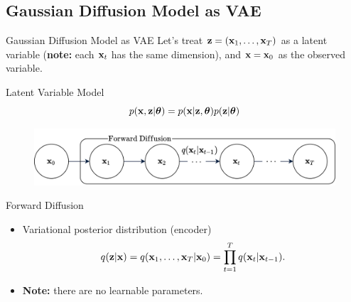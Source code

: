 \documentclass{beamer}
\begin{document}
\subsection{Gaussian Diffusion Model as VAE}
\begin{frame}{Gaussian Diffusion Model as VAE}
    Let's treat $\mathbf{z} = (\mathbf{x}_1, \dots, \mathbf{x}_T)$ as a latent variable (\textbf{note:} each $\mathbf{x}_t$ has the same dimension), and $\mathbf{x} = \mathbf{x}_0$ as the observed variable.
    \begin{block}{Latent Variable Model}
        \vspace{-0.3cm}
        \[
            p(\mathbf{x}, \mathbf{z} | \boldsymbol{\theta}) = p(\mathbf{x} | \mathbf{z}, \boldsymbol{\theta}) p(\mathbf{z} | \boldsymbol{\theta})
        \]    
        \vspace{-0.7cm}
    \end{block}
    \eqpause
    \begin{figure}
        \includegraphics[width=0.8\linewidth]{figs/diffusion_pgm_forward}
    \end{figure}
    \eqpause
    \vspace{-0.3cm}
    \begin{block}{Forward Diffusion}
        \begin{itemize}
            \item Variational posterior distribution (encoder)
            \vspace{-0.3cm}
            \[
                q(\mathbf{z} | \mathbf{x}) = q(\mathbf{x}_1, \dots, \mathbf{x}_T | \mathbf{x}_0) = \prod_{t = 1}^T q(\mathbf{x}_t | \mathbf{x}_{t - 1}).
            \]
            \item \textbf{Note:} there are no learnable parameters.
        \end{itemize}
        \vspace{-0.5cm}
    \end{block}
\end{frame}
\end{document}
